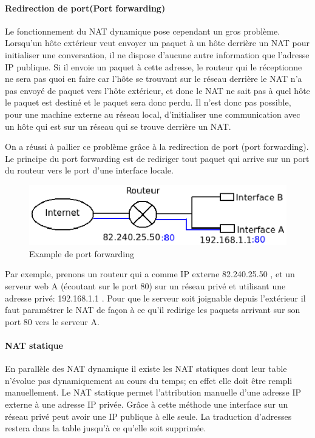 \paragraph{Redirection de port(Port forwarding)}

Le fonctionnement du NAT dynamique pose cependant un gros problème. Lorsqu'un
hôte extérieur veut envoyer un paquet à un hôte derrière un NAT pour
initialiser une conversation, il ne dispose d'aucune autre information que
l'adresse IP publique. Si il envoie un paquet à cette adresse, le routeur
qui le réceptionne ne sera pas quoi en faire car l'hôte se trouvant sur le
réseau derrière le NAT n'a pas envoyé de paquet vers l'hôte extérieur, et donc
le NAT ne sait pas à quel hôte le paquet est destiné et le paquet sera donc
perdu. Il n'est donc pas possible, pour une machine externe au réseau local,
d'initialiser une communication avec un hôte qui est sur un réseau qui se
trouve derrière un NAT.

On a réussi à pallier ce problème grâce à la redirection de port (port
forwarding).  Le principe du port forwarding est de rediriger tout paquet qui
arrive sur un port du routeur vers le port d'une interface locale.

\begin{figure}[h]
\centering
\includegraphics{./pics/port_forwarding.eps}
\caption{Example de port forwarding}
\label{fig:portfow}
\end{figure}

Par exemple, prenons un routeur qui a comme IP externe 82.240.25.50 , et un
serveur web A (écoutant sur le port 80) sur un réseau privé et utilisant une
adresse privé: 192.168.1.1 . Pour que le serveur soit joignable depuis
l'extérieur il faut paramétrer le NAT de façon à ce qu'il redirige les paquets
arrivant sur son port 80 vers le serveur A.

\paragraph{NAT statique} En parallèle des NAT dynamique il existe les NAT
statiques dont leur table n'évolue pas dynamiquement au cours du temps; en effet
elle doit être rempli manuellement.  Le NAT statique permet l'attribution
manuelle d'une adresse IP externe à une adresse IP privée. Grâce à cette
méthode une interface sur un réseau privé peut avoir une IP publique à elle
seule.  La traduction d'adresses restera dans la table jusqu'à ce qu'elle soit
supprimée. 

